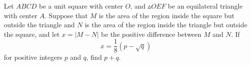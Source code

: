 Let $ABCD$ be a unit square with center $O$, and $\vartriangle OEF$ be an equilateral triangle with center $A$. Suppose that $M$ is the area of the region inside the square but outside the triangle and $N$ is the area of the region inside the triangle but outside the square, and let $x = |M -N|$ be the positive difference between $M$ and $N$. If $$x =\dfrac{1}{8}(p -\sqrt{q})$$for positive integers $p$ and $q$, find $p + q$.
